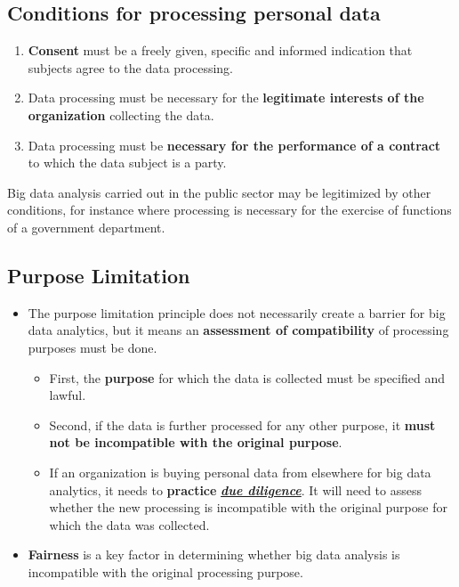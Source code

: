\documentclass[a4paper]{article}
\begin{document}
		\subsection{Conditions for processing personal data}
		
		\begin{enumerate}
			\item \textbf{Consent} must be a freely given, specific and informed indication that subjects agree to the data processing.
			\item Data processing must be necessary for the \textbf{legitimate interests of the organization} collecting the data.
			\item Data processing must be \textbf{necessary for the performance of a contract} to which the data subject is a party.
		\end{enumerate}
	\vspace{1em}
	\noindent
		Big data analysis carried out in the public sector may be legitimized by other conditions, for instance where processing is necessary for the exercise of functions of a government department.
		
		\subsection{Purpose Limitation}
		
		\begin{itemize}
			\item The purpose limitation principle does not necessarily create a barrier for big data analytics, but it means an \textbf{assessment of compatibility} of processing purposes must be done.
				\begin{itemize}
					\item First, the \textbf{purpose} for which the data is collected must be specified and lawful.
					\item Second, if the data is further processed for any other purpose, it \textbf{must not be incompatible with the original purpose}.
					\item If an organization is buying personal data from elsewhere for big data analytics, it needs to \textbf{practice} \href{https://en.wikipedia.org/wiki/Due_diligence}{\textit{\textbf{due diligence}}}.
						It will need to assess whether the new processing is incompatible with the original purpose for which the data was collected.
				\end{itemize}
			\item \textbf{Fairness} is a key factor in determining whether big data analysis is incompatible with the original processing purpose. 
		\end{itemize}
	
\end{document}
